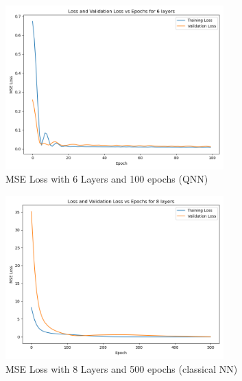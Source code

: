 \documentclass[11pt,oneside]{article}
\theoremstyle{definition}
\theoremstyle{definition}
\begin{document}
\begin{figure}[hbt!]
    \centering
    \includegraphics[width=0.75\textwidth]{images/mse_with_val.png}
    \caption{MSE Loss with 6 Layers and 100 epochs (QNN)}
    \label{t5}
\end{figure}

\begin{figure}[hbt!]
    \centering
    \includegraphics[width=0.75\textwidth]{images/mse_with_val_classical.png}
    \caption{MSE Loss with 8 Layers and 500 epochs (classical NN)}
    \label{t6}
\end{figure}

\FloatBarrier



\end{document}
